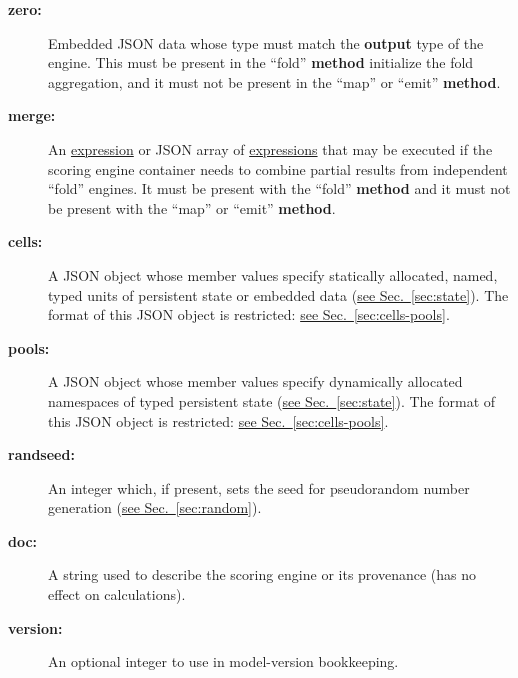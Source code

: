 \documentclass{article}
\newcommand{\PFAc}{\ttfamily\bfseries}
\newenvironment{allowedfields}%
  {\begin{center} \begin{minipage}{0.9\linewidth} \begin{description}}%
  {\end{description} \end{minipage} \end{center}}
\theoremstyle{definition}
\begin{document}
\begin{allowedfields}
\item[\PFAc zero:] Embedded JSON data whose type must match the {\PFAc output} type of the engine.  This must be present in the ``fold'' {\PFAc method} initialize the fold aggregation, and it must not be present in the ``map'' or ``emit'' {\PFAc method}.
\end{allowedfields}
\begin{allowedfields}
\item[\PFAc merge:] An \hyperlink{hsec:expressions}{expression} or JSON array of \hyperlink{hsec:expressions}{expressions} that may be executed if the scoring engine container needs to combine partial results from independent ``fold'' engines.  It must be present with the ``fold'' {\PFAc method} and it must not be present with the ``map'' or ``emit'' {\PFAc method}.
\end{allowedfields}
\begin{allowedfields}
\item[\PFAc cells:] A JSON object whose member values specify statically allocated, named, typed units of persistent state or embedded data (\hyperlink{hsec:state}{see Sec.~\ref{sec:state}}).  The format of this JSON object is restricted: \hyperlink{hsec:cells-pools}{see Sec.~\ref{sec:cells-pools}}.
\end{allowedfields}
\begin{allowedfields}
\item[\PFAc pools:] A JSON object whose member values specify dynamically allocated namespaces of typed persistent state (\hyperlink{hsec:state}{see Sec.~\ref{sec:state}}).  The format of this JSON object is restricted: \hyperlink{hsec:cells-pools}{see Sec.~\ref{sec:cells-pools}}.
\end{allowedfields}
\begin{allowedfields}
\item[\PFAc randseed:] An integer which, if present, sets the seed for pseudorandom number generation (\hyperlink{hsec:method}{see Sec.~\ref{sec:random}}).
\end{allowedfields}
\begin{allowedfields}
\item[\PFAc doc:] A string used to describe the scoring engine or its provenance (has no effect on calculations).
\end{allowedfields}
\begin{allowedfields}
\item[\PFAc version:] An optional integer to use in model-version bookkeeping.
\end{allowedfields}
\end{document}
